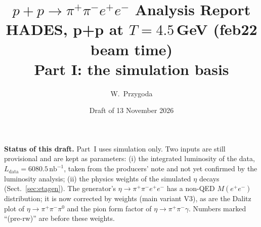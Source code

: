 \documentclass[11pt,a4paper]{article}
\title{\Large $p + p \to \pi^{+}\pi^{-}e^{+}e^{-}$ Analysis Report\\[0.4em]
       \normalsize HADES, p+p at $T = 4.5$\,GeV (feb22 beam time)\\
       Part I: the simulation basis}
\author{W.~Przygoda}
\date{Draft of 13 November 2026}
\newcommand{\piz}{\ensuremath{\pi^{0}}\xspace}
\newcommand{\pipi}{\ensuremath{\pi^{+}\pi^{-}}\xspace}
\newcommand{\ppee}{\ensuremath{\pi^{+}\pi^{-}e^{+}e^{-}}\xspace}
\newcommand{\Mee}{\ensuremath{M(e^{+}e^{-})}\xspace}
\newcommand{\nbinv}{\ensuremath{\mathrm{nb}^{-1}}\xspace}
\newcommand{\Ldata}{\ensuremath{L_{\mathrm{data}}}\xspace}
\newcommand{\notebox}[1]{\par\noindent\colorbox{orange!10}{\parbox{\dimexpr\linewidth-2\fboxsep\relax}{#1}}\par}
\begin{document}
\maketitle

\notebox{\textbf{Status of this draft.}
Part~I uses simulation only. Two inputs are still provisional and are kept as parameters:
(i) the integrated luminosity of the data, $\Ldata = 6080.5\,\nbinv$, taken from the
producers' note and not yet confirmed by the luminosity analysis;
(ii) the physics weights of the simulated $\eta$ decays (Sect.~\ref{sec:etagen}). The
generator's $\eta\to\ppee$ has a non-QED $\Mee$ distribution; it is now corrected by weights
(main variant V3), as are the Dalitz plot of $\eta\to\pipi\piz$ and the pion form factor of
$\eta\to\pipi\gamma$. Numbers marked ``(pre-rw)'' are before these weights.}

\tableofcontents
\end{document}
